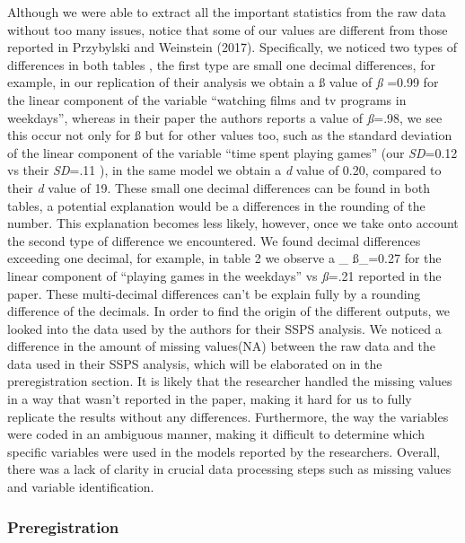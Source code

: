 \documentclass[man]{apa6}
\theoremstyle{definition}
\theoremstyle{definition}
\theoremstyle{definition}
\theoremstyle{remark}
\begin{document}
Although we were able to extract all the important statistics from the
raw data without too many issues, notice that some of our values are
different from those reported in Przybylski and Weinstein (2017).
Specifically, we noticed two types of differences in both tables , the
first type are small one decimal differences, for example, in our
replication of their analysis we obtain a ß value of \emph{ß} =0.99 for
the linear component of the variable \enquote{watching films and tv
programs in weekdays}, whereas in their paper the authors reports a
value of \emph{ß}=.98, we see this occur not only for ß but for other
values too, such as the standard deviation of the linear component of
the variable \enquote{time spent playing games} (our \emph{SD}=0.12 vs
their \emph{SD}=.11 ), in the same model we obtain a
\emph{\textbar{}d\textbar{}} value of 0.20, compared to their
\emph{\textbar{}d\textbar{}} value of 19. These small one decimal
differences can be found in both tables, a potential explanation would
be a differences in the rounding of the number. This explanation becomes
less likely, however, once we take onto account the second type of
difference we encountered. We found decimal differences exceeding one
decimal, for example, in table 2 we observe a \_ ß\_=0.27 for the linear
component of \enquote{playing games in the weekdays} vs \emph{ß}=.21
reported in the paper. These multi-decimal differences can't be explain
fully by a rounding difference of the decimals. In order to find the
origin of the different outputs, we looked into the data used by the
authors for their SSPS analysis. We noticed a difference in the amount
of missing values(NA) between the raw data and the data used in their
SSPS analysis, which will be elaborated on in the preregistration
section. It is likely that the researcher handled the missing values in
a way that wasn't reported in the paper, making it hard for us to fully
replicate the results without any differences. Furthermore, the way the
variables were coded in an ambiguous manner, making it difficult to
determine which specific variables were used in the models reported by
the researchers. Overall, there was a lack of clarity in crucial data
processing steps such as missing values and variable identification.

\subsubsection{Preregistration}\label{preregistration}
\end{document}
